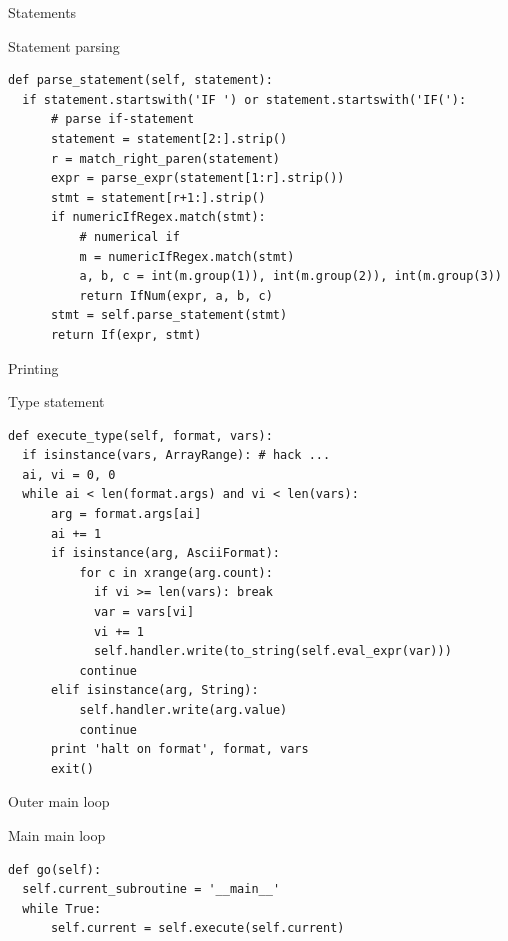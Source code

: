 \documentclass{beamer}
\def\py{
  \lstset{
     language=Python,
     extendedchars=true,
     basicstyle=\footnotesize\ttfamily,
     showstringspaces=false,
     showspaces=false,
     numbersep=9pt,
     tabsize=2,
     breaklines=true,
     showtabs=false,
     captionpos=b
  }
}
\begin{document}
\begin{frame}[fragile]{Statements}

\begin{block}{Statement parsing}
\py
\begin{lstlisting}
def parse_statement(self, statement):
  if statement.startswith('IF ') or statement.startswith('IF('):
      # parse if-statement
      statement = statement[2:].strip()
      r = match_right_paren(statement)
      expr = parse_expr(statement[1:r].strip())
      stmt = statement[r+1:].strip()
      if numericIfRegex.match(stmt):
          # numerical if
          m = numericIfRegex.match(stmt)
          a, b, c = int(m.group(1)), int(m.group(2)), int(m.group(3))
          return IfNum(expr, a, b, c)
      stmt = self.parse_statement(stmt)
      return If(expr, stmt)
\end{lstlisting}
\end{block}
\end{frame}

\begin{frame}[fragile]{Printing}

\begin{block}{Type statement}
\py
\begin{lstlisting}
def execute_type(self, format, vars):
  if isinstance(vars, ArrayRange): # hack ...
  ai, vi = 0, 0
  while ai < len(format.args) and vi < len(vars):
      arg = format.args[ai]
      ai += 1
      if isinstance(arg, AsciiFormat):
          for c in xrange(arg.count):
            if vi >= len(vars): break
            var = vars[vi]
            vi += 1
            self.handler.write(to_string(self.eval_expr(var)))
          continue
      elif isinstance(arg, String):
          self.handler.write(arg.value)
          continue
      print 'halt on format', format, vars
      exit()
\end{lstlisting}
\end{block}
\end{frame}

\begin{frame}[fragile]{Outer main loop}

\begin{block}{Main main loop}
\py
\begin{lstlisting}
def go(self):
  self.current_subroutine = '__main__'
  while True:
      self.current = self.execute(self.current)
\end{lstlisting}
\end{block}
\end{frame}
\end{document}
